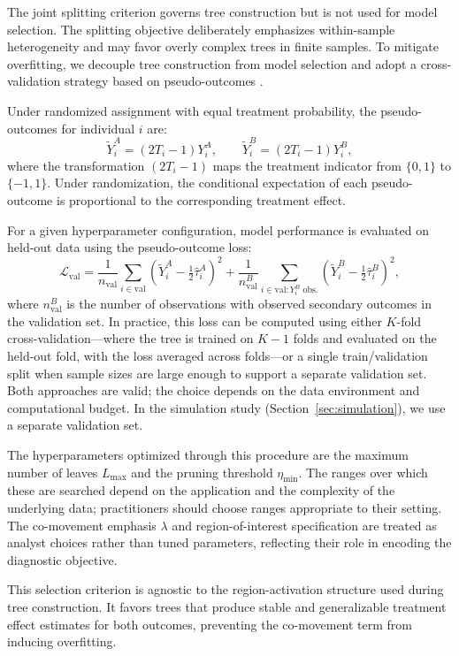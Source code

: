 \documentclass[11pt,letterpaper,english]{article}
\theoremstyle{definition}
\theoremstyle{definition}
\begin{document}
\begin{bibunit}
The joint splitting criterion governs tree construction but is not used for model selection. The splitting objective deliberately emphasizes within-sample heterogeneity and may favor overly complex trees in finite samples. To mitigate overfitting, we decouple tree construction from model selection and adopt a cross-validation strategy based on pseudo-outcomes \citep{wager2018estimation}.

Under randomized assignment with equal treatment probability, the pseudo-outcomes for individual $i$ are:
\[
\tilde{Y}^A_i = (2T_i - 1) Y^A_i, \qquad
\tilde{Y}^B_i = (2T_i - 1) Y^B_i,
\]
where the transformation $(2T_i - 1)$ maps the treatment indicator from $\{0,1\}$ to $\{-1,1\}$. Under randomization, the conditional expectation of each pseudo-outcome is proportional to the corresponding treatment effect.

For a given hyperparameter configuration, model performance is evaluated on held-out data using the pseudo-outcome loss:
\[
\mathcal{L}_{\text{val}}
=
\frac{1}{n_{\text{val}}} \sum_{i \in \text{val}}
\left( \tilde{Y}^A_i - \tfrac{1}{2}\hat{\tau}^A_i \right)^2
+
\frac{1}{n_{\text{val}}^B} \sum_{i \in \text{val} : Y_i^B \text{ obs.}}
\left( \tilde{Y}^B_i - \tfrac{1}{2}\hat{\tau}^B_i \right)^2,
\]
where $n_{\text{val}}^B$ is the number of observations with observed secondary outcomes in the validation set. In practice, this loss can be computed using either $K$-fold cross-validation---where the tree is trained on $K-1$ folds and evaluated on the held-out fold, with the loss averaged across folds---or a single train/validation split when sample sizes are large enough to support a separate validation set. Both approaches are valid; the choice depends on the data environment and computational budget. In the simulation study (Section~\ref{sec:simulation}), we use a separate validation set.

The hyperparameters optimized through this procedure are the maximum number of leaves $L_{\max}$ and the pruning threshold $\eta_{\min}$. The ranges over which these are searched depend on the application and the complexity of the underlying data; practitioners should choose ranges appropriate to their setting. The co-movement emphasis $\lambda$ and region-of-interest specification are treated as analyst choices rather than tuned parameters, reflecting their role in encoding the diagnostic objective.

This selection criterion is agnostic to the region-activation structure used during tree construction. It favors trees that produce stable and generalizable treatment effect estimates for both outcomes, preventing the co-movement term from inducing overfitting.


\end{bibunit}
\end{document}
